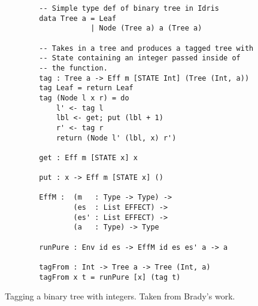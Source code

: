 \begin{figure}[h]
    \caption{Tagging a binary tree with integers. Taken from Brady's work.
    \cite{algebraic}}
    \label{tag_def}
    \begin{lstlisting}
        -- Simple type def of binary tree in Idris
        data Tree a = Leaf
                    | Node (Tree a) a (Tree a)
        
        -- Takes in a tree and produces a tagged tree with
        -- State containing an integer passed inside of
        -- the function. 
        tag : Tree a -> Eff m [STATE Int] (Tree (Int, a))
        tag Leaf = return Leaf
        tag (Node l x r) = do
            l' <- tag l
            lbl <- get; put (lbl + 1)
            r' <- tag r
            return (Node l' (lbl, x) r')
        
        get : Eff m [STATE x] x
        
        put : x -> Eff m [STATE x] ()
        
        EffM :  (m   : Type -> Type) ->
                (es  : List EFFECT) ->
                (es' : List EFFECT) ->
                (a   : Type) -> Type
        
        runPure : Env id es -> EffM id es es' a -> a
        
        tagFrom : Int -> Tree a -> Tree (Int, a)
        tagFrom x t = runPure [x] (tag t)
    \end{lstlisting}
\end{figure}